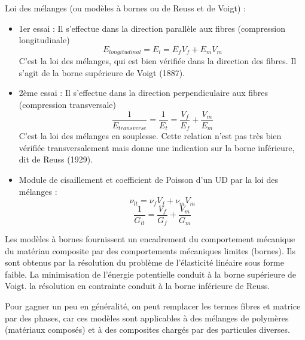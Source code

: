\medskip
Loi des mélanges (ou modèles à bornes ou de Reuss et de Voigt) :
\begin{itemize}
	\item 1er essai : Il s'effectue dans la direction parallèle aux fibres (compression longitudinale)
		\begin{equation} E_{longitudinal}=E_l=E_fV_f+E_mV_m \end{equation}
		C'est la loi des mélanges, qui est bien vérifiée dans la direction des fibres.
		Il s'agit de la borne supérieure de Voigt (1887).
	\item 2ème essai : Il s'effectue dans la direction perpendiculaire aux fibres (compression transversale)
		\begin{equation}\dfrac1{E_{transverse}}=\dfrac1{E_t} = \dfrac{V_f}{E_f}+\dfrac{V_m}{E_m}\end{equation}
		C'est la loi des mélanges en souplesse.
		Cette relation n'est pas très bien vérifiée transversalement mais donne une 
		indication sur la borne inférieure, dit de Reuss (1929).
	\item Module de cisaillement et coefficient de Poisson
		d'un UD par la loi des mélanges :
		\begin{equation}\nu_{lt}=\nu_fV_f+\nu_mV_m\end{equation}
		\begin{equation}\dfrac1{G_{lt}} = \dfrac{V_f}{G_f}+\dfrac{V_m}{G_m}\end{equation}
\end{itemize}

\medskip
Les modèles à bornes fournissent un encadrement du comportement mécanique du matériau composite 
par des comportements mécaniques limites (bornes). 
Ils sont obtenus par la résolution du problème de l'élasticité linéaire sous forme faible.
La minimisation de l'énergie potentielle conduit à la borne supérieure de Voigt.
la résolution en contrainte conduit à la borne inférieure de Reuss.

\medskip
Pour gagner un peu en généralité, on peut remplacer les termes fibres et matrice par des phases,
car ces modèles sont applicables à des mélanges de polymères (matériaux composés) 
et à des composites chargés par des particules diverses. 

